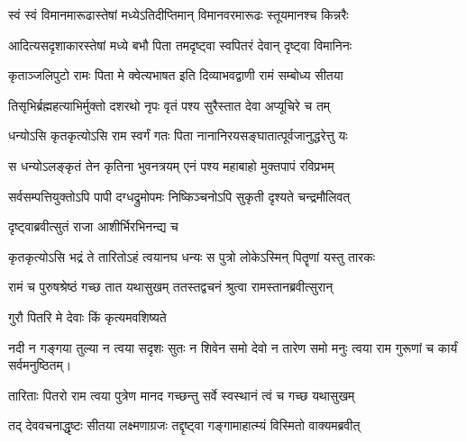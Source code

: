 \twolineshloka
{स्वं स्वं विमानमारूढास्तेषां मध्येऽतिदीप्तिमान्}
{विमानवरमारूढः स्तूयमानश्च किन्नरैः} %

\twolineshloka
{आदित्यसदृशाकारस्तेषां मध्ये बभौ पिता}
{तमदृष्ट्वा स्वपितरं देवान् दृष्ट्वा विमानिनः} %

\twolineshloka
{कृताञ्जलिपुटो रामः पिता मे क्वेत्यभाषत}
{इति दिव्याभवद्वाणी रामं सम्बोध्य सीतया} %

\twolineshloka
{तिसृभिर्ब्रह्महत्याभिर्मुक्तो दशरथो नृपः}
{वृतं पश्य सुरैस्तात देवा अप्यूचिरे च तम्} %



\twolineshloka
{धन्योऽसि कृतकृत्योऽसि राम स्वर्गं गतः पिता}
{नानानिरयसङ्घातात्पूर्वजानुद्धरेत्तु यः} %

\twolineshloka
{स धन्योऽलङ्कृतं तेन कृतिना भुवनत्रयम्}
{एनं पश्य महाबाहो मुक्तपापं रविप्रभम्} %

\twolineshloka
{सर्वसम्पत्तियुक्तोऽपि पापी दग्धद्रुमोपमः}
{निष्किञ्चनोऽपि सुकृती दृश्यते चन्द्रमौलिवत्} %



\onelineshloka
{दृष्ट्वाब्रवीत्सुतं राजा आशीर्भिरभिनन्द्य च}%



\twolineshloka
{कृतकृत्योऽसि भद्रं ते तारितोऽहं त्वयानघ}
{धन्यः स पुत्रो लोकेऽस्मिन् पितॄणां यस्तु तारकः} %



\twolineshloka
{रामं च पुरुषश्रेष्ठं गच्छ तात यथासुखम्}
{ततस्तद्वचनं श्रुत्वा रामस्तानब्रवीत्सुरान्} %



\onelineshloka
{गुरौ पितरि मे देवाः किं कृत्यमवशिष्यते}%



\twolineshloka
{नदी न गङ्गया तुल्या न त्वया सदृशः सुतः}
{न शिवेन समो देवो न तारेण समो मनुः} %
त्वया राम गुरूणां च कार्यं सर्वमनुष्ठितम्।

\twolineshloka
{तारिताः पितरो राम त्वया पुत्रेण मानद}
{गच्छन्तु सर्वे स्वस्थानं त्वं च गच्छ यथासुखम्} %



\twolineshloka
{तद् देववचनाद्धृष्टः सीतया लक्ष्मणाग्रजः}
{तद्दृष्ट्वा गङ्गामाहात्म्यं विस्मितो वाक्यमब्रवीत्} %



